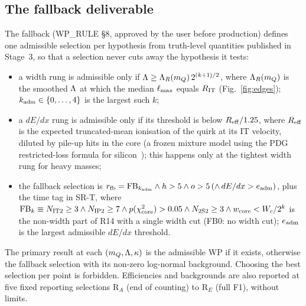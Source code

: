\subsection{The fallback deliverable}\label{sec:strategy:fallback}
The fallback (WP\_RULE \S8, approved by the user before production) defines one admissible selection per
hypothesis from truth-level quantities published in Stage~3, so that a selection never cuts away the hypothesis it tests:
\begin{itemize}
\item a width rung is admissible only if $\Lambda\ge\Lambda_R(m_Q)\,2^{(k+1)/2}$, where $\Lambda_R(m_Q)$ is the smoothed $\Lambda$
  at which the median $\ell_{\max}$ equals $R_{\rm IT}$ (Fig.~\ref{fig:edges}); $k_{\rm adm}\in\{0,\ldots,4\}$ is the largest such $k$;
\item a $dE/dx$ rung is admissible only if its threshold is below $R_{\rm eff}/1.25$, where $R_{\rm eff}$ is the expected
  truncated-mean ionisation of the quirk at its IT velocity, diluted by pile-up hits in the core (a frozen mixture model
  using the PDG restricted-loss formula for silicon~\cite{ParticleDataGroup:2024cfk}); this happens only at the tightest
  width rung for heavy masses;
\item the fallback selection is $r_{\rm fb}={\rm FB}_{k_{\rm adm}}\wedge h>5\wedge o>5\,(\wedge\,dE/dx>e_{\rm adm})$, plus
  the time tag in SR-T, where ${\rm FB}_k\equiv N_{\rm IT2}\ge3\wedge N_{\rm IP2}\ge7\wedge p(\chi^2_{\rm core})>0.05\wedge
  N_{\rm 2S2}\ge3\wedge w_{\rm core}<W_c/2^k$ is the non-width part of R14 with a single width cut (FB0: no width cut);
  $e_{\rm adm}$ is the largest admissible $dE/dx$ threshold.
\end{itemize}
The primary result at each $(m_Q,\Lambda,\kappa)$ is the admissible WP if it exists, otherwise the fallback selection with its
non-zero log-normal background. Choosing the best selection per point is forbidden. Efficiencies and backgrounds are also
reported at five fixed reporting selections R$_A$ (end of counting) to R$_E$ (full F1), without limits.

